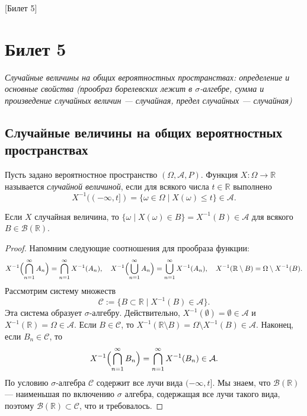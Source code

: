 [Билет 5]

\section{Билет 5}

\begin{center}
    \it Случайные величины на общих вероятностных пространствах: определение и основные свойства (прообраз борелевских лежит в $\sigma$-алгебре, сумма и произведение случайных величин --- случайная, предел случайных --- случайная)
\end{center}

\sectionbreak
\subsection{Случайные величины на общих вероятностных пространствах}

\begin{definition}
    Пусть задано вероятностное пространство $(\Omega, \mathcal{A}, P)$.
    Функция $X \colon \Omega \to \mathbb{R}$ называется {\it случайной величиной}, если
    для всякого числа $t \in \mathbb{R}$ выполнено
    \[
        X^{-1}((-\infty, t]) = \{\omega \in \Omega \mid X(\omega) \leqslant t\} \in \mathcal{A}.
    \]
\end{definition}

\begin{proposal*}
    Если $X$ случайная величина, то $\{\omega \mid X(\omega) \in B\} = X^{-1}(B) \in \mathcal{A}$ для всякого $B \in \mathcal{B}(\mathbb{R})$.
\end{proposal*}

\begin{proof}
    Напомним следующие соотношения для прообраза функции:
    \[
        X^{-1}\Bigl( \bigcap\limits_{n=1}^\infty A_n \Bigr) = \bigcap\limits_{n=1}^\infty X^{-1}(A_n), \quad X^{-1}\Bigl(\bigcup\limits_{n = 1}^\infty A_n\Bigr) = \bigcup\limits_{n = 1}^\infty X^{-1}(A_n), \quad X^{-1}(\mathbb{R} \setminus B) = \Omega \setminus X^{-1}(B).
    \]
    Рассмотрим систему множеств
    \[
        \mathcal{C} := \{B \subset \mathbb{R} \mid X^{-1}(B) \in \mathcal{A}\}.
    \]
    Эта система образует $\sigma$-алгебру.
    Действительно, $X^{-1}(\emptyset) = \emptyset \in \mathcal{A}$ и
    $X^{-1}(\mathbb{R}) = \Omega \in \mathcal{A}$.
    Если $B \in \mathcal{C}$, то $X^{-1}(\mathbb{R} \setminus B) = \Omega \setminus X^{-1}(B) \in \mathcal{A}$.
    Наконец, если $B_n \in \mathcal{C}$, то
    \[
        X^{-1}\Bigl(\bigcap\limits_{n = 1}^\infty B_n\Bigr) = \bigcap\limits_{n = 1}^\infty X^{-1}(B_n) \in \mathcal{A}.
    \]
    По условию $\sigma$-алгебра $\mathcal{C}$ содержит все лучи вида $(-\infty, t]$.
    Мы знаем, что $\mathcal{B}(\mathbb{R})$ --- наименьшая по включению $\sigma$ алгебра, содержащая все лучи такого вида, поэтому $\mathcal{B}(\mathbb{R}) \subset \mathcal{C}$, что и требовалось.
\end{proof}

